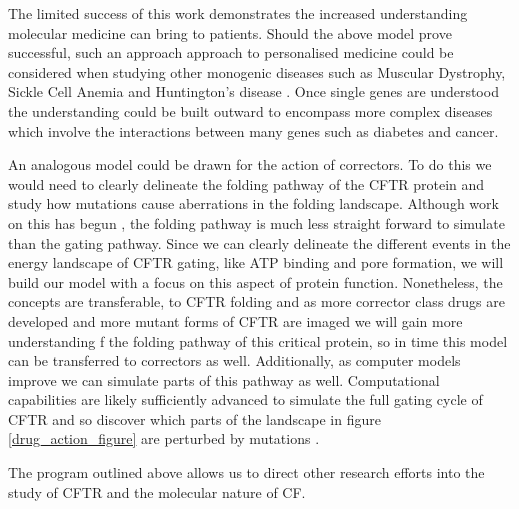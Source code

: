 The limited success of this work demonstrates the increased understanding molecular medicine can bring to patients. Should the above model prove successful, such an approach approach to personalised medicine could  be considered when studying other monogenic diseases such as Muscular Dystrophy, Sickle Cell Anemia and Huntington's disease \cite{}.  Once single genes are understood the understanding could be built outward to encompass more complex diseases which involve the interactions between many genes such as diabetes and cancer. 

An analogous model could be drawn for the action of correctors. To do this we would need to clearly delineate the folding pathway of the CFTR protein and study how mutations cause aberrations in the folding landscape. Although work on this has begun \cite{krainer2018, kleizen2021, kleizen2020, fiedorczuk2022}, the folding pathway is much less straight forward to simulate than the gating pathway. Since we can clearly delineate the different events in the energy landscape of CFTR gating, like ATP binding and pore formation, we will build our model with a focus on this aspect of protein function. Nonetheless, the concepts are transferable, to CFTR folding and as more corrector class drugs are developed and more mutant forms of CFTR are imaged we will gain more understanding f the folding pathway of this critical protein, so in time this model can be transferred to correctors as well. Additionally, as computer models improve we can simulate parts of this pathway as well. Computational capabilities are likely sufficiently advanced to simulate the full gating cycle of CFTR and so discover which parts of the landscape in figure \ref{drug_action_figure} are perturbed by mutations \cite{}. 




The program outlined above allows us to direct other research efforts into the study of CFTR and the molecular nature of CF. 


